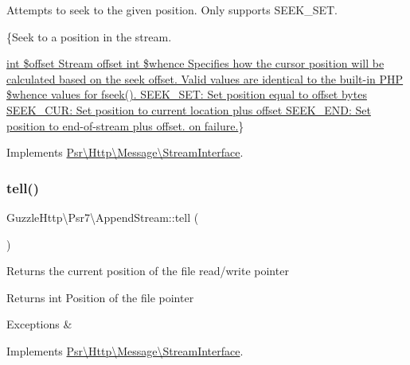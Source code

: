 Attempts to seek to the given position. Only supports S\+E\+E\+K\+\_\+\+S\+ET.

\{Seek to a position in the stream.

\hyperlink{}{int \$offset Stream offset  int \$whence Specifies how the cursor position will be calculated based on the seek offset. Valid values are identical to the built-\/in P\+HP \$whence values for {\ttfamily fseek()}. S\+E\+E\+K\+\_\+\+S\+E\+T\+: Set position equal to offset bytes S\+E\+E\+K\+\_\+\+C\+U\+R\+: Set position to current location plus offset S\+E\+E\+K\+\_\+\+E\+N\+D\+: Set position to end-\/of-\/stream plus offset.   on failure.}\} 

Implements \hyperlink{interfacePsr_1_1Http_1_1Message_1_1StreamInterface_a96ee062dc6cf4022d655dd15eaa81208}{Psr\textbackslash{}\+Http\textbackslash{}\+Message\textbackslash{}\+Stream\+Interface}.

\mbox{\label{classGuzzleHttp_1_1Psr7_1_1AppendStream_a011a51b4b1ef1f4b604f64b234be3e77}} 
\subsubsection{\texorpdfstring{tell()}{tell()}}
{\footnotesize\ttfamily Guzzle\+Http\textbackslash{}\+Psr7\textbackslash{}\+Append\+Stream\+::tell (\begin{DoxyParamCaption}{ }\end{DoxyParamCaption})}

Returns the current position of the file read/write pointer

\begin{DoxyReturn}{Returns}
int Position of the file pointer 
\end{DoxyReturn}

\begin{DoxyExceptions}{Exceptions}
{\em } & \\
\hline
\end{DoxyExceptions}


Implements \hyperlink{interfacePsr_1_1Http_1_1Message_1_1StreamInterface_a9aa2f88a38f496d74100f42ddf0656ef}{Psr\textbackslash{}\+Http\textbackslash{}\+Message\textbackslash{}\+Stream\+Interface}.

\mbox{\label{classGuzzleHttp_1_1Psr7_1_1AppendStream_a59f42807cb0e63251779113dd8d80db2}} 
